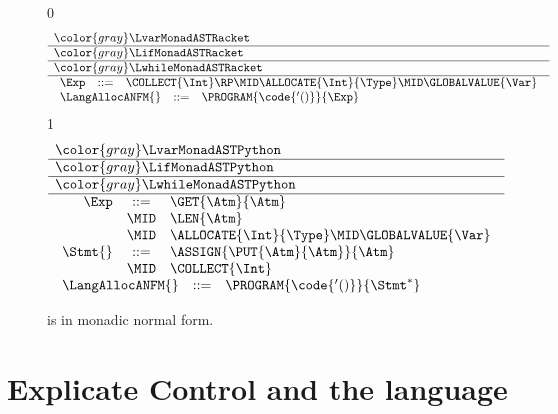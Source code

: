 \documentclass[7x10]{TimesAPriori_MIT}%
\newcommand{\gray}[1]{{\color{gray} #1}}
\def\racketEd{0}
\def\pythonEd{1}
\def\edition{0}
\numberwithin{theorem}{chapter}
\numberwithin{definition}{chapter}
\numberwithin{equation}{chapter}
\begin{document}
\newcommand{\LtupMonadASTRacket}{
\begin{array}{rcl}
\Exp &::=& \COLLECT{\Int} \RP \MID \ALLOCATE{\Int}{\Type}
   \MID \GLOBALVALUE{\Var}
\end{array}

}

\newcommand{\LtupMonadASTPython}{
\begin{array}{rcl}
\Exp &::=& \GET{\Atm}{\Atm} \\
     &\MID& \LEN{\Atm}\\
   &\MID& \ALLOCATE{\Int}{\Type}
    \MID \GLOBALVALUE{\Var} \\
\Stmt{} &::=& \ASSIGN{\PUT{\Atm}{\Atm}}{\Atm} \\
   &\MID& \COLLECT{\Int}
\end{array}
}

\begin{figure}[tp]
\centering
\begin{tcolorbox}[colback=white]
\small
{\if\edition\racketEd    
\[
\begin{array}{l}
  \gray{\LvarMonadASTRacket} \\ \hline
  \gray{\LifMonadASTRacket} \\ \hline
  \gray{\LwhileMonadASTRacket} \\ \hline
    \LtupMonadASTRacket \\
\begin{array}{rcl}
\LangAllocANFM{}  &::=& \PROGRAM{\code{'()}}{\Exp} 
\end{array}
\end{array}
\]
\fi}
{\if\edition\pythonEd
\[
\begin{array}{l}
  \gray{\LvarMonadASTPython} \\ \hline
  \gray{\LifMonadASTPython} \\ \hline
  \gray{\LwhileMonadASTPython} \\ \hline
  \LtupMonadASTPython   \\
  \begin{array}{rcl}
     \LangAllocANFM{} &::=& \PROGRAM{\code{'()}}{\Stmt^{*}}
  \end{array}
\end{array}
\]
\fi}
\end{tcolorbox}

\caption{\LangAllocANF{} is \LangAlloc{} in monadic normal form.}
\label{fig:Lvec-anf-syntax}
\end{figure}


\section{Explicate Control and the \LangCVec{} language}
\label{sec:explicate-control-r3}
\end{document}
